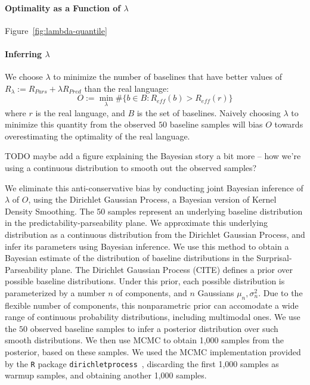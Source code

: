 \documentclass[10pt,twoside,lineno]{article}
\begin{document}
\paragraph{Optimality as a Function of $\lambda$}


Figure~\ref{fig:lambda-quantile}

\paragraph{Inferring $\lambda$}
We choose $\lambda$ to minimize the number of baselines that have better values of $R_\lambda := R_{Pars} + \lambda R_{Pred}$ than the real language:
\begin{equation}
	O := \min_\lambda \# \{b \in B: R_{eff}(b) > R_{eff}(r)\}
\end{equation}
where $r$ is the real language, and $B$ is the set of baselines.
Naively choosing $\lambda$ to minimize this quantity from the observed $50$ baseline samples will bias $O$ towards overestimating the optimality of the real language.

TODO maybe add a figure explaining the Bayesian story a bit more -- how we're using a continuous distribution to smooth out the observed samples?

We eliminate this anti-conservative bias by conducting joint Bayesian inference of $\lambda$ of $O$, using the Dirichlet Gaussian Process, a Bayesian version of Kernel Density Smoothing.
The 50 samples represent an underlying baseline distribution in the predictability-parseability plane.
We approximate this underlying distribution as a continuous distribution from the Dirichlet Gaussian Process, and infer its parameters using Bayesian inference.
We use this method to obtain a Bayesian estimate of the distribution of baseline distributions in the Surprisal-Parseability plane.
The Dirichlet Gaussian Process (CITE) defines a prior over possible baseline distributions.
Under this prior, each possible distribution is parameterized by a number $n$ of components, and $n$ Gaussians $\mu_n, \sigma^2_n$.
Due to the flexible number of components, this nonparametric prior can accomodate a wide range of continuous probability distributions, including multimodal ones.
We use the $50$ observed baseline samples to infer a posterior distribution over such smooth distributions.
We then use MCMC to obtain 1,000 samples from the posterior, based on these samples.
We used the MCMC implementation provided by the \texttt{R} \citep{R2013} package \texttt{dirichletprocess}~\citep{ross2018dirichletprocess}, discarding the first 1,000 samples as warmup samples, and obtaining another 1,000 samples.
\end{document}
